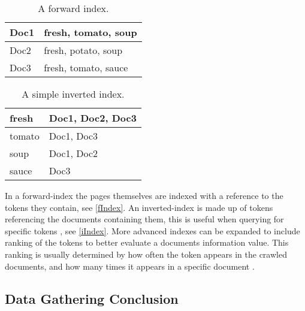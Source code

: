 \begin{minipage}{.40\textwidth}
  \centering
  \begin{table}[H]
	\centering
    \begin{tabular}{|l|l|}
\hline
Doc1 & fresh, tomato, soup \\ \hline
Doc2 & fresh, potato, soup \\ \hline
Doc3 & fresh, tomato, sauce \\ \hline
	\end{tabular}
	\caption{A forward index.}
	\label{fIndex}
  \end{table}
\end{minipage}
\begin{minipage}{0.5\textwidth}
  \centering
  \begin{table}[H]
	\centering
    \begin{tabular}{|l|l|}
\hline
fresh & Doc1, Doc2, Doc3 \\ \hline
tomato & Doc1, Doc3 \\ \hline
soup & Doc1, Doc2 \\ \hline
sauce & Doc3 \\ \hline
	\end{tabular}
	\caption{A simple inverted index.}
	\label{iIndex}
  \end{table}
\end{minipage}\nl

In a forward-index the pages themselves are indexed with a reference to the
tokens they contain, see \autoref{fIndex}. An inverted-index is made up of
tokens referencing the documents containing them, this is useful when
querying for specific tokens \citep{Index3}, see \autoref{iIndex}. More advanced
indexes can be expanded to include ranking of the tokens to better
evaluate a documents information value. This ranking is usually determined by
how often the token appears in the crawled documents, and how many times it
appears in a specific document \Source.

\subsection{Data Gathering Conclusion}



